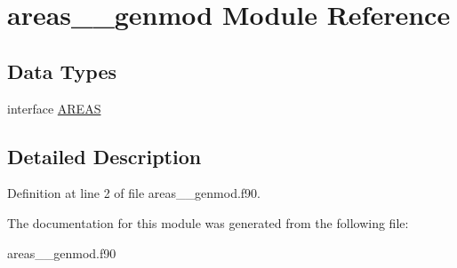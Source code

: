 \hypertarget{classareas____genmod}{\section{areas\+\_\+\+\_\+genmod Module Reference}
\label{classareas____genmod}
}
\subsection*{Data Types}
\begin{DoxyCompactItemize}
\item 
interface \hyperlink{interfaceareas____genmod_1_1_a_r_e_a_s}{A\+R\+E\+A\+S}
\end{DoxyCompactItemize}


\subsection{Detailed Description}


Definition at line 2 of file areas\+\_\+\+\_\+genmod.\+f90.



The documentation for this module was generated from the following file\+:\begin{DoxyCompactItemize}
\item 
areas\+\_\+\+\_\+genmod.\+f90\end{DoxyCompactItemize}
